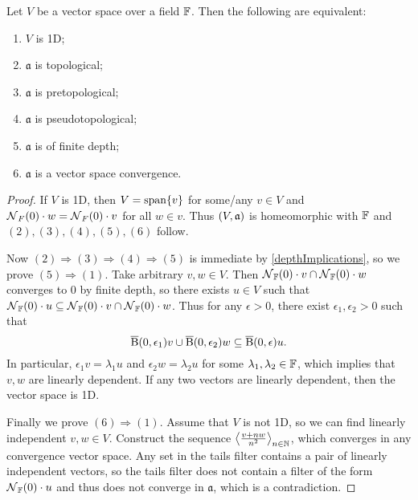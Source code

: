 \begin{lemma}
Let $V$ be a vector space over a field $\mathbb{F}$. Then the following are equivalent:
\begin{enumerate}
\item $V$ is 1D;
\item $\mathfrak{a}$ is topological;
\item $\mathfrak{a}$ is pretopological;
\item $\mathfrak{a}$ is pseudotopological;
\item $\mathfrak{a}$ is of finite depth;
\item $\mathfrak{a}$ is a vector space convergence.
\end{enumerate}
\end{lemma}
\begin{proof}
If $V$ is 1D, then $V= \operatorname{span}\{v\}$ for some/any $v\in V$ and $\operatorname{\mathcal{N}}_F(0)\cdot w = \operatorname{\mathcal{N}}_F(0)\cdot v$ for all $w\in v$. Thus $\sSet{V, \mathfrak{a}}$ is homeomorphic with $\mathbb{F}$ and $(2),(3),(4),(5),(6)$ follow.

Now $(2)\Rightarrow (3) \Rightarrow (4) \Rightarrow (5)$ is immediate by \ref{depthImplications}, so we prove $(5)\Rightarrow (1)$. Take arbitrary $v,w\in V$. Then $\operatorname{\mathcal{N}}_{\mathbb{F}}(0)\cdot v \cap \operatorname{\mathcal{N}}_{\mathbb{F}}(0)\cdot w$ converges to $0$ by finite depth, so there exists $u\in V$ such that $\operatorname{\mathcal{N}}_{\mathbb{F}}(0)\cdot u \subseteq \operatorname{\mathcal{N}}_{\mathbb{F}}(0)\cdot v\cap \operatorname{\mathcal{N}}_{\mathbb{F}}(0)\cdot w$. Thus for any $\epsilon > 0$, there exist $\epsilon_1, \epsilon_2 >0$ such that
\[ \operatorname{\overline{B}}(0,\epsilon_1)v \cup \operatorname{\overline{B}}(0,\epsilon_2)w \subseteq \operatorname{\overline{B}}(0,\epsilon)u. \]
In particular, $\epsilon_1v = \lambda_1 u$ and $\epsilon_2w = \lambda_2 u$ for some $\lambda_1,\lambda_2 \in\mathbb{F}$, which implies that $v,w$ are linearly dependent. If any two vectors are linearly dependent, then the vector space is 1D.

Finally we prove $(6)\Rightarrow (1)$. Assume that $V$ is not 1D, so we can find linearly independent $v,w\in V$. Construct the sequence $\left\langle \frac{v+nw}{n^2} \right\rangle_{n\in \mathbb{N}}$, which converges in any convergence vector space. Any set in the tails filter contains a pair of linearly independent vectors, so the tails filter does not contain a filter of the form $\operatorname{\mathcal{N}}_{\mathbb{F}}(0)\cdot u$ and thus does not converge in $\mathfrak{a}$, which is a contradiction.
\end{proof}

